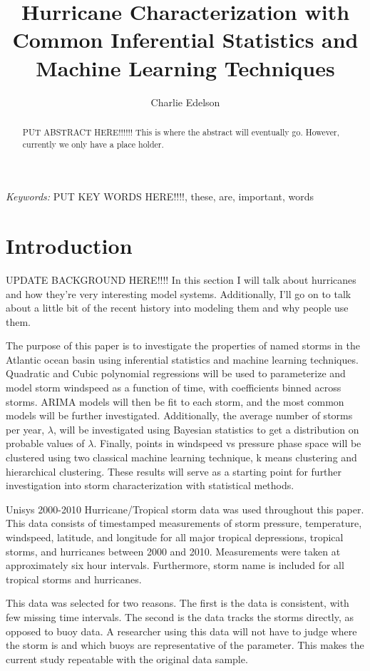 \documentclass{article}
\title{Hurricane Characterization with Common Inferential Statistics and Machine Learning Techniques}
\author{Charlie Edelson}
\providecommand{\keywords}[1]{\small{\textit{Keywords:} #1}}
\begin{document}
	
	\maketitle

	\begin{abstract}
	PUT ABSTRACT HERE!!!!!! This is where the abstract will eventually go. However, currently we only have a place holder.
	\end{abstract}
	
	\keywords{PUT KEY WORDS HERE!!!!, these, are, important, words}

	\section{Introduction}
	UPDATE BACKGROUND HERE!!!! In this section I will talk about hurricanes and how they're very interesting model systems. Additionally, I'll go on to talk about a little bit of the recent history into modeling them and why people use them.
	
	The purpose of this paper is to investigate the properties of named storms in the Atlantic ocean basin using inferential 
statistics and machine learning techniques. Quadratic and Cubic polynomial regressions will be used to parameterize and model storm 
windspeed as a function of time, with coefficients binned across storms. ARIMA models will then be fit to each storm, and the most common 
models will be further investigated. Additionally, the average number of storms per year, $\lambda$, will be investigated using Bayesian 
statistics to get a distribution on probable values of $\lambda$. Finally, points in windspeed vs pressure phase space will be clustered 
using two classical machine learning technique, k means clustering and hierarchical clustering. These results will serve as a starting point for further investigation into storm characterization with statistical methods.

	Unisys 2000-2010 Hurricane/Tropical storm data was used throughout this paper\cite{Unisys}. This data consists of timestamped 
measurements of storm pressure, temperature, windspeed, latitude, and longitude for all major tropical depressions, tropical storms, and 
hurricanes between 2000 and 2010. Measurements were taken at approximately six hour intervals. Furthermore, storm name is included for all 
tropical storms and hurricanes.

	This data was selected for two reasons. The first is the data is consistent, with few missing time intervals. The second is the 
data tracks the storms directly, as opposed to buoy data. A researcher using this data will not have to judge where the storm is and which 
buoys are representative of the parameter. This makes the current study repeatable with the original data sample.
\end{document}
